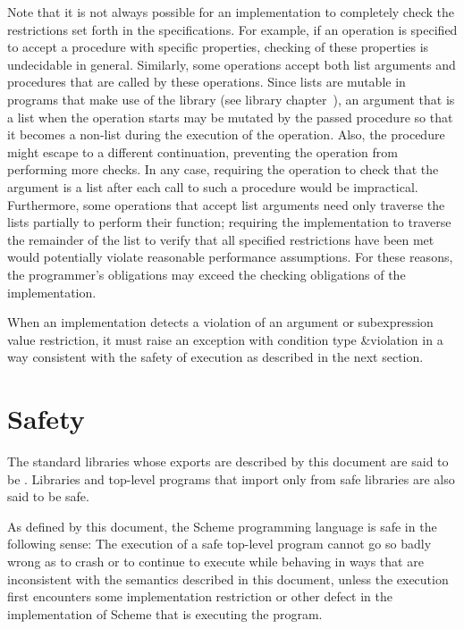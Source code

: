 Note that it is not always possible for an implementation to completely check
the restrictions set forth in the specifications.  For example, if an
operation is specified to accept a procedure with specific properties,
checking of these properties is undecidable in general.  Similarly,
some operations accept both list arguments and procedures that are
called by these operations.  Since lists are mutable in programs that
make use of the  library (see library
chapter~), an argument that is a list
when the operation starts may be mutated by the passed procedure so
that it becomes a non-list during the execution of the operation.
Also, the procedure might escape to a different continuation,
preventing the operation from performing more checks.
In any case, requiring the operation to check that the argument is a list after
each call to such a procedure would be impractical.  Furthermore, some
operations that accept list arguments need only traverse the lists
partially to perform their function; requiring the implementation to
traverse the remainder of the list to verify that all specified
restrictions have been met would potentially
violate reasonable performance assumptions.  For these reasons, the
programmer's obligations may exceed the checking obligations of the
implementation.

When an implementation detects a violation of an argument or
subexpression value restriction, it must raise an exception with
condition type {\cf\&violation} in a way
consistent with the safety of execution as described in the next
section.

\section{Safety}
\label{safeunsafemodesection}

The standard libraries whose exports are described by this document
are said to be .  Libraries and top-level
programs that import only from safe libraries are also said to be safe.

As defined by this document, the Scheme programming language
is safe in the following sense:
The execution of a safe top-level program
cannot go so badly wrong as to crash or to continue to
execute while behaving in ways that are
inconsistent with the semantics described in this document,
unless the execution first encounters some implementation
restriction or other defect in the implementation of Scheme
that is executing the program.

